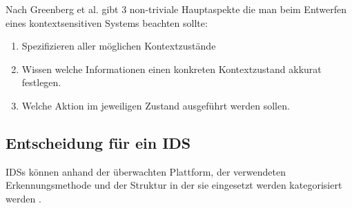 Nach Greenberg et al. \cite{greenberg2001context} gibt 3 non-triviale Hauptaspekte die man beim Entwerfen eines kontextsensitiven Systems beachten sollte: 
\begin{enumerate}
\item{Spezifizieren aller möglichen Kontextzustände}
\item{Wissen welche Informationen einen konkreten Kontextzustand akkurat festlegen.}
\item{Welche Aktion im jeweiligen Zustand ausgeführt werden sollen.}
\end{enumerate}
\pagebreak
\subsection{Entscheidung für ein IDS}
IDSs können anhand der überwachten Plattform, der verwendeten Erkennungsmethode und der Struktur in der sie eingesetzt werden kategorisiert werden \cite{milenkoski_evaluating_2015}.\\\\
